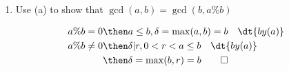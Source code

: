 \documentclass[basic]{nosvagor-notes}
\begin{document}
\begin{multicols}{2}
\begin{enumerate}[label=(\alph*)]
        \item Use (a) to show that \(\gcd(a,b) = \gcd(b, a\%b)\)

          \begin{align*}
           \hspace{-1em} a\%b = 0 &\then a \leq b, \delta = \max(a,b) = b \quad \dt{by (a)} \\
           \hspace{-1em} a\%b \neq 0 &\then \delta|r, 0 < r < a \leq b \quad \dt{by (a)} \\
            &\then \delta = \max(b, r) = b \qed
          \end{align*}

      \end{enumerate}

  \end{multicols}
\end{document}
